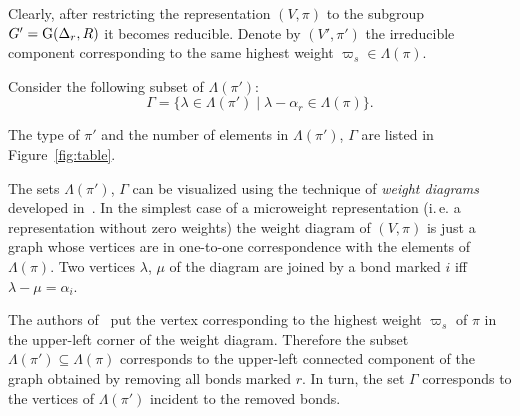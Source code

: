 Clearly, after restricting the representation $(V, \pi)$ to the subgroup $G'=\operatorname{G}(\Delta_r, R)$ it becomes reducible.
Denote by $(V', \pi')$ the irreducible component corresponding to the same highest weight $\varpi_s \in \Lambda(\pi)$.

Consider the following subset of $\Lambda(\pi')$:
$$ \Gamma = \{\lambda \in \Lambda(\pi') \mid \lambda - \alpha_r \in \Lambda(\pi) \}.$$

The type of $\pi'$ and the number of elements in $\Lambda(\pi')$, $\Gamma$ are listed in Figure~\ref{fig:table}.

\begin{rem}
The sets $\Lambda(\pi')$, $\Gamma$ can be visualized using the technique of {\it weight diagrams} developed in~\cite{PSV98}.
In the simplest case of a microweight representation (i.\,e. a representation without zero weights)
the weight diagram of $(V, \pi)$ is just a graph whose vertices are in one-to-one correspondence with the elements of $\Lambda(\pi)$.
Two vertices $\lambda$, $\mu$ of the diagram are joined by a bond marked $i$ iff $\lambda-\mu = \alpha_i$.

The authors of~\cite{PSV98} put the vertex corresponding to the highest weight $\varpi_s$ of $\pi$ in the upper-left corner of the weight diagram.
Therefore the subset $\Lambda(\pi') \subseteq \Lambda(\pi)$ corresponds to the upper-left connected component of the graph obtained by removing all bonds marked $r$.
In turn, the set $\Gamma$ corresponds to the vertices of $\Lambda(\pi')$ incident to the removed bonds.
\end{rem}

